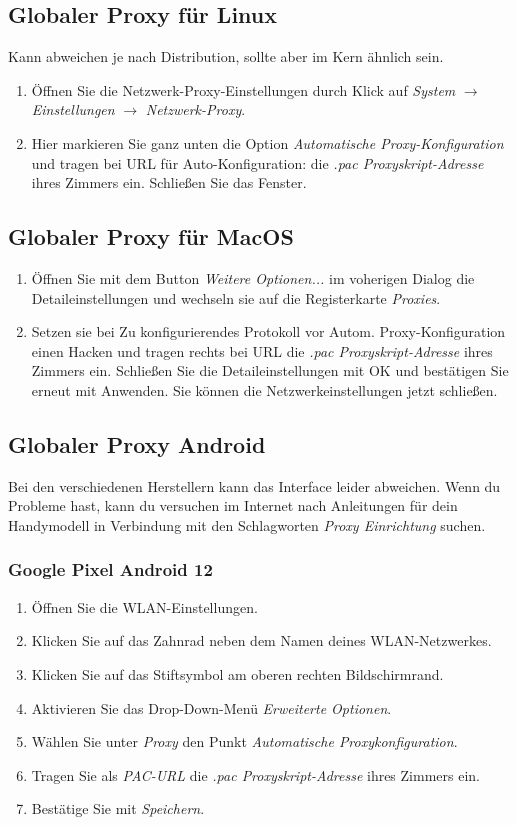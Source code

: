 \documentclass[a4paper,12pt]{scrartcl}
\begin{document}
\subsection{Globaler Proxy für Linux}
Kann abweichen je nach Distribution, sollte aber im Kern ähnlich sein.
\begin{enumerate}
	\item Öffnen Sie die Netzwerk-Proxy-Einstellungen durch Klick auf \emph{System} $\rightarrow$ \emph{Einstellungen} $\rightarrow$ \emph{Netzwerk-Proxy}.
	\item Hier markieren Sie ganz unten die Option \emph{Automatische Proxy-Konfiguration} und tragen bei URL für Auto-Konfiguration: die \textit{.pac Proxyskript-Adresse} ihres Zimmers ein. Schließen Sie das Fenster. 
\end{enumerate}

\subsection{Globaler Proxy für MacOS}
\begin{enumerate}
	\item Öffnen Sie mit dem Button \emph{Weitere Optionen...} im voherigen Dialog die Detaileinstellungen und wechseln sie auf die Registerkarte \emph{Proxies}.
	\item Setzen sie bei Zu konfigurierendes Protokoll vor Autom. Proxy-Konfiguration einen Hacken und tragen rechts bei URL die \textit{.pac Proxyskript-Adresse} ihres Zimmers ein. Schließen Sie die Detaileinstellungen mit OK und bestätigen Sie erneut mit Anwenden. Sie können die Netzwerkeinstellungen jetzt schließen.
\end{enumerate}

\subsection{Globaler Proxy Android}
Bei den verschiedenen Herstellern kann das Interface leider abweichen.
Wenn du Probleme hast, kann du versuchen im Internet nach Anleitungen für dein Handymodell in Verbindung mit den Schlagworten \textit{Proxy Einrichtung} suchen.

\subsubsection*{Google Pixel Android 12}
\begin{enumerate}
	\item Öffnen Sie die WLAN-Einstellungen.
	\item Klicken Sie auf das Zahnrad neben dem Namen deines WLAN-Netzwerkes.
	\item Klicken Sie auf das Stiftsymbol am oberen rechten Bildschirmrand.
	\item Aktivieren Sie das Drop-Down-Menü \textit{Erweiterte Optionen}.
	\item Wählen Sie unter \textit{Proxy} den Punkt \textit{Automatische Proxykonfiguration}.
	\item Tragen Sie als \textit{PAC-URL} die \textit{.pac Proxyskript-Adresse} ihres Zimmers ein.
	\item Bestätige Sie mit \textit{Speichern}.
\end{enumerate}
\end{document}
